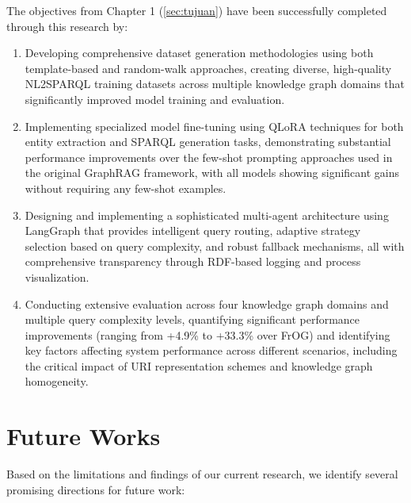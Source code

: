 The objectives from Chapter 1 (\ref{sec:tujuan}) have been successfully completed through this research by:
\begin{enumerate}
    \item Developing comprehensive dataset generation methodologies using both template-based and random-walk approaches, creating diverse, high-quality NL2SPARQL training datasets across multiple knowledge graph domains that significantly improved model training and evaluation.
    
    \item Implementing specialized model fine-tuning using QLoRA techniques for both entity extraction and SPARQL generation tasks, demonstrating substantial performance improvements over the few-shot prompting approaches used in the original GraphRAG framework, with all models showing significant gains without requiring any few-shot examples.
    
    \item Designing and implementing a sophisticated multi-agent architecture using LangGraph that provides intelligent query routing, adaptive strategy selection based on query complexity, and robust fallback mechanisms, all with comprehensive transparency through RDF-based logging and process visualization.
    
    \item Conducting extensive evaluation across four knowledge graph domains and multiple query complexity levels, quantifying significant performance improvements (ranging from +4.9\% to +33.3\% over FrOG) and identifying key factors affecting system performance across different scenarios, including the critical impact of URI representation schemes and knowledge graph homogeneity.
\end{enumerate}

\section{Future Works}
Based on the limitations and findings of our current research, we identify several promising directions for future work:

